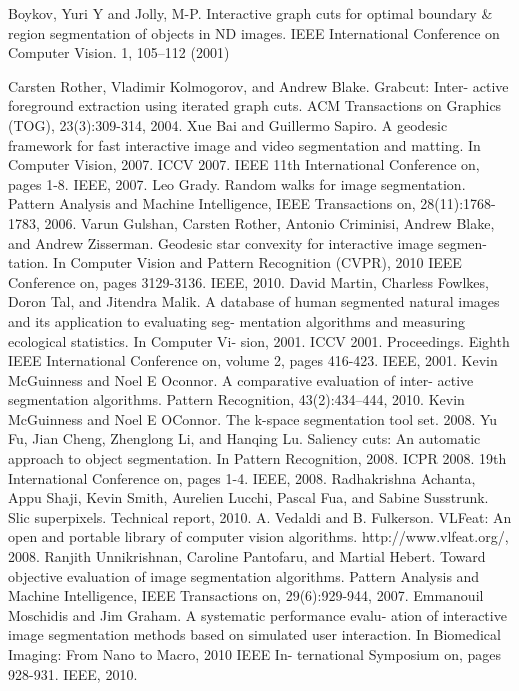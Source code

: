 \documentclass[runningheads,a4paper]{llncs}
\begin{document}
%
%
\small{
\begin{thebibliography}{12}

 Boykov, Yuri Y and Jolly, M-P. Interactive graph cuts for optimal boundary \& region segmentation of objects in ND images. IEEE International Conference on Computer Vision. 1, 105--112 (2001)

 Carsten Rother, Vladimir Kolmogorov, and Andrew Blake. Grabcut: Inter-
active foreground extraction using iterated graph cuts. ACM Transactions
on Graphics (TOG), 23(3):309-314, 2004.
 Xue Bai and Guillermo Sapiro. A geodesic framework for fast interactive image and video segmentation and matting. In Computer Vision, 2007. ICCV 2007. IEEE 11th International Conference on, pages 1-8. IEEE, 2007.
 Leo Grady. Random walks for image segmentation. Pattern Analysis and Machine Intelligence, IEEE Transactions on, 28(11):1768-1783, 2006.
 Varun Gulshan, Carsten Rother, Antonio Criminisi, Andrew Blake, and Andrew Zisserman. Geodesic star convexity for interactive image segmen- tation. In Computer Vision and Pattern Recognition (CVPR), 2010 IEEE Conference on, pages 3129-3136. IEEE, 2010.
 David Martin, Charless Fowlkes, Doron Tal, and Jitendra Malik. A database of human segmented natural images and its application to evaluating seg- mentation algorithms and measuring ecological statistics. In Computer Vi- sion, 2001. ICCV 2001. Proceedings. Eighth IEEE International Conference on, volume 2, pages 416-423. IEEE, 2001.
 Kevin McGuinness and Noel E Oconnor. A comparative evaluation of inter- active segmentation algorithms. Pattern Recognition, 43(2):434--444, 2010.
 Kevin McGuinness and Noel E OConnor. The k-space segmentation tool set. 2008.
 Yu Fu, Jian Cheng, Zhenglong Li, and Hanqing Lu. Saliency cuts: An automatic approach to object segmentation. In Pattern Recognition, 2008. ICPR 2008. 19th International Conference on, pages 1-4. IEEE, 2008.
 Radhakrishna Achanta, Appu Shaji, Kevin Smith, Aurelien Lucchi, Pascal Fua, and Sabine Susstrunk. Slic superpixels. Technical report, 2010.
 A. Vedaldi and B. Fulkerson. VLFeat: An open and portable library of
computer vision algorithms. http://www.vlfeat.org/, 2008.
 Ranjith Unnikrishnan, Caroline Pantofaru, and Martial Hebert. Toward
objective evaluation of image segmentation algorithms. Pattern Analysis
and Machine Intelligence, IEEE Transactions on, 29(6):929-944, 2007.
Emmanouil Moschidis and Jim Graham. A systematic performance evalu-
ation of interactive image segmentation methods based on simulated user interaction. In Biomedical Imaging: From Nano to Macro, 2010 IEEE In- ternational Symposium on, pages 928-931. IEEE, 2010.
\end{thebibliography}

}
\end{document}
